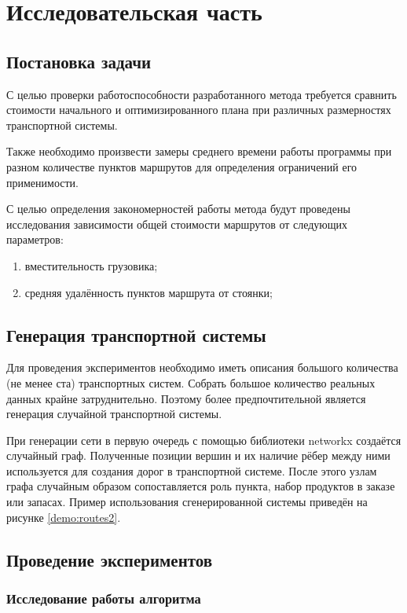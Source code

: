 \section{Исследовательская часть}
\subsection{Постановка задачи}
С целью проверки работоспособности разработанного метода требуется сравнить стоимости начального и оптимизированного плана при различных размерностях транспортной системы.

Также необходимо произвести замеры среднего времени работы программы при разном количестве пунктов маршрутов для определения ограничений его применимости.

С целью определения закономерностей работы метода будут проведены исследования зависимости общей стоимости маршрутов от следующих параметров:

\begin{enumerate}
	\item вместительность грузовика;
	\item средняя удалённость пунктов маршрута от стоянки;
\end{enumerate}

\subsection{Генерация транспортной системы}
Для проведения экспериментов необходимо иметь описания большого количества (не менее ста) транспортных систем. Собрать большое количество реальных данных крайне затруднительно. Поэтому более предпочтительной является генерация случайной транспортной системы.

При генерации сети в первую очередь с помощью библиотеки networkx создаётся случайный граф. Полученные позиции вершин и их наличие рёбер между ними используется для создания дорог в транспортной системе. После этого узлам графа случайным образом сопоставляется роль пункта, набор продуктов в заказе или запасах. Пример использования сгенерированной системы приведён на рисунке \ref{demo:routes2}.

\subsection{Проведение экспериментов}

\subsubsection{Исследование работы алгоритма}

